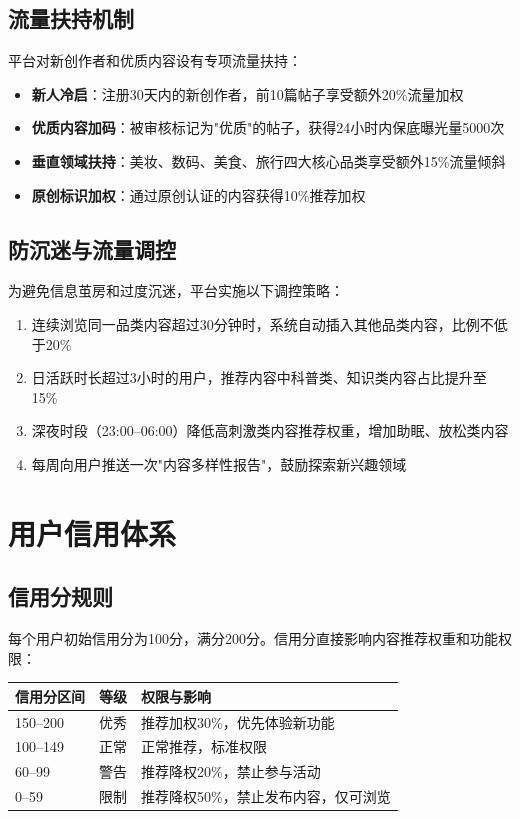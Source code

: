 \documentclass[a4paper,12pt]{article}
\begin{document}
\subsection{流量扶持机制}

平台对新创作者和优质内容设有专项流量扶持：

\begin{itemize}[noitemsep]
  \item \textbf{新人冷启}：注册30天内的新创作者，前10篇帖子享受额外20\%流量加权
  \item \textbf{优质内容加码}：被审核标记为"优质"的帖子，获得24小时内保底曝光量5000次
  \item \textbf{垂直领域扶持}：美妆、数码、美食、旅行四大核心品类享受额外15\%流量倾斜
  \item \textbf{原创标识加权}：通过原创认证的内容获得10\%推荐加权
\end{itemize}

\subsection{防沉迷与流量调控}

为避免信息茧房和过度沉迷，平台实施以下调控策略：

\begin{enumerate}[noitemsep]
  \item 连续浏览同一品类内容超过30分钟时，系统自动插入其他品类内容，比例不低于20\%
  \item 日活跃时长超过3小时的用户，推荐内容中科普类、知识类内容占比提升至15\%
  \item 深夜时段（23:00--06:00）降低高刺激类内容推荐权重，增加助眠、放松类内容
  \item 每周向用户推送一次"内容多样性报告"，鼓励探索新兴趣领域
\end{enumerate}

\section{用户信用体系}

\subsection{信用分规则}

每个用户初始信用分为100分，满分200分。信用分直接影响内容推荐权重和功能权限：

\begin{table}[h]
\centering
\begin{tabular}{llp{6cm}}
\toprule
\textbf{信用分区间} & \textbf{等级} & \textbf{权限与影响} \\
\midrule
150--200 & 优秀 & 推荐加权30\%，优先体验新功能 \\
100--149 & 正常 & 正常推荐，标准权限 \\
60--99 & 警告 & 推荐降权20\%，禁止参与活动 \\
0--59 & 限制 & 推荐降权50\%，禁止发布内容，仅可浏览 \\
\bottomrule
\end{tabular}
\end{table}
\end{document}

